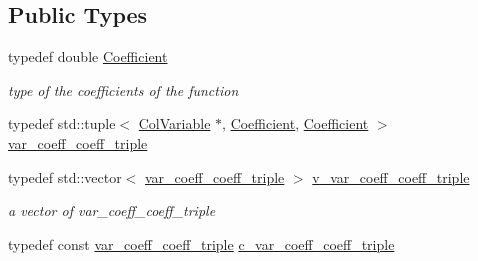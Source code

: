 \subsection*{Public Types}
\begin{DoxyCompactItemize}
\item 
\mbox{\label{class_s_m_spp__di__unipi__it_1_1_d_quad_function_a1fa0f848dbb8d52dc62a1adfee1a1f90}} 
typedef double \mbox{\hyperlink{class_s_m_spp__di__unipi__it_1_1_d_quad_function_a1fa0f848dbb8d52dc62a1adfee1a1f90}{Coefficient}}
\begin{DoxyCompactList}\small\item\em type of the coefficients of the function \end{DoxyCompactList}\item 
typedef std\+::tuple$<$ \mbox{\hyperlink{class_s_m_spp__di__unipi__it_1_1_col_variable}{Col\+Variable}} $\ast$, \mbox{\hyperlink{class_s_m_spp__di__unipi__it_1_1_d_quad_function_a1fa0f848dbb8d52dc62a1adfee1a1f90}{Coefficient}}, \mbox{\hyperlink{class_s_m_spp__di__unipi__it_1_1_d_quad_function_a1fa0f848dbb8d52dc62a1adfee1a1f90}{Coefficient}} $>$ \mbox{\hyperlink{class_s_m_spp__di__unipi__it_1_1_d_quad_function_a4da2c2c235cb90ba0e970725de950bf9}{var\+\_\+coeff\+\_\+coeff\+\_\+triple}}
\item 
\mbox{\label{class_s_m_spp__di__unipi__it_1_1_d_quad_function_adaced695e00a65836eb558a7bfbd85f4}} 
typedef std\+::vector$<$ \mbox{\hyperlink{class_s_m_spp__di__unipi__it_1_1_d_quad_function_a4da2c2c235cb90ba0e970725de950bf9}{var\+\_\+coeff\+\_\+coeff\+\_\+triple}} $>$ \mbox{\hyperlink{class_s_m_spp__di__unipi__it_1_1_d_quad_function_adaced695e00a65836eb558a7bfbd85f4}{v\+\_\+var\+\_\+coeff\+\_\+coeff\+\_\+triple}}
\begin{DoxyCompactList}\small\item\em a vector of var\+\_\+coeff\+\_\+coeff\+\_\+triple \end{DoxyCompactList}\item 
\mbox{\label{class_s_m_spp__di__unipi__it_1_1_d_quad_function_ab56e0a7b06118543c8c7ca5c5f51ede2}} 
typedef const \mbox{\hyperlink{class_s_m_spp__di__unipi__it_1_1_d_quad_function_a4da2c2c235cb90ba0e970725de950bf9}{var\+\_\+coeff\+\_\+coeff\+\_\+triple}} \mbox{\hyperlink{class_s_m_spp__di__unipi__it_1_1_d_quad_function_ab56e0a7b06118543c8c7ca5c5f51ede2}{c\+\_\+var\+\_\+coeff\+\_\+coeff\+\_\+triple}}

\end{DoxyCompactItemize}
